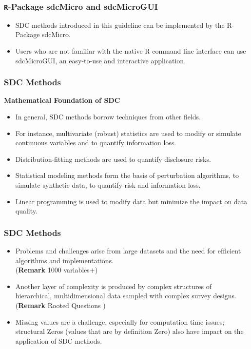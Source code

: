 \documentclass{beamer}
\begin{document}
	\begin{frame}
		\frametitle{\texttt{R}-Package sdcMicro and sdcMicroGUI}
		
		\begin{itemize}
			\item SDC methods introduced in this guideline can be implemented by the R-Package
			sdcMicro. 
			\item Users who are not familiar with the native R command line interface
			can use sdcMicroGUI, an easy-to-use and interactive application. 
		\end{itemize}
	\end{frame}
	\begin{frame}
		\frametitle{SDC Methods} 
		\textbf{Mathematical Foundation of SDC}
		\begin{itemize}
			\item In general, SDC methods borrow techniques from other ﬁelds. 
			\item For instance, multivariate (robust) statistics are used to modify or simulate continuous variables and
			to quantify information loss. 
			
			\item Distribution-fitting methods are used to quantify
			disclosure risks.
			\item Statistical modeling methods form the basis of perturbation algorithms, to simulate synthetic data, to quantify risk and information loss. 
			\item Linear
			programming is used to modify data but minimize the impact on data quality.
		\end{itemize}
	\end{frame}
	\begin{frame}
		\frametitle{SDC Methods} 
		\begin{itemize}
			\item
			Problems and challenges arise from large datasets and the need for efﬁcient algorithms and implementations.\\ (\textbf{Remark} 1000 variables+)
			\item Another layer of complexity is produced by complex
			structures of hierarchical, multidimensional data sampled with complex survey designs. \\ (\textbf{Remark} Rooted Questions )
			\item 
			Missing values are a challenge, especially for computation time issues; structural Zeros (values that are by deﬁnition Zero) also have impact on the application
			of SDC methods. 
		\end{itemize}
	\end{frame}
\end{document}

